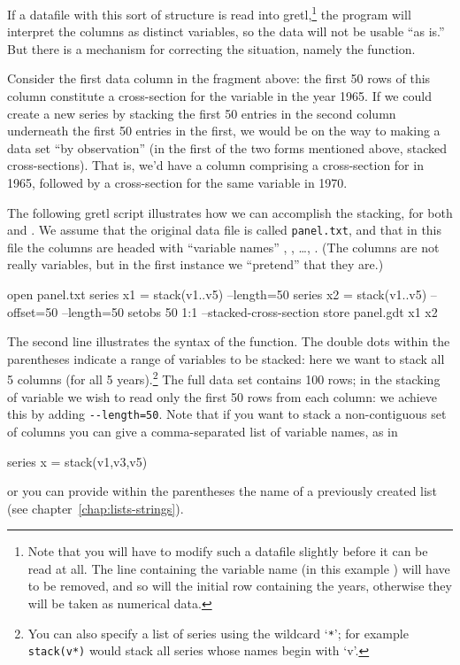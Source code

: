 If a datafile with this sort of structure is read into
gretl,\footnote{Note that you will have to modify such a
  datafile slightly before it can be read at all.  The line containing
  the variable name (in this example ) will have to be
  removed, and so will the initial row containing the years,
  otherwise they will be taken as numerical data.}  the program
will interpret the columns as distinct variables, so the data will not
be usable ``as is.''  But there is a mechanism for correcting the
situation, namely the  function.

Consider the first data column in the fragment above: the first 50 rows
of this column constitute a cross-section for the variable 
in the year 1965.  If we could create a new series by stacking the
first 50 entries in the second column underneath the first 50 entries
in the first, we would be on the way to making a data set ``by
observation'' (in the first of the two forms mentioned above, stacked
cross-sections).  That is, we'd have a column comprising a
cross-section for  in 1965, followed by a cross-section for
the same variable in 1970.

The following gretl script illustrates how we can accomplish the
stacking, for both  and .  We assume
that the original data file is called \texttt{panel.txt}, and that in
this file the columns are headed with ``variable names'' ,
, \dots, .  (The columns are not really
variables, but in the first instance we ``pretend'' that they are.)

\begin{code}
open panel.txt
series x1 = stack(v1..v5) --length=50
series x2 = stack(v1..v5) --offset=50 --length=50
setobs 50 1:1 --stacked-cross-section
store panel.gdt x1 x2
\end{code}

The second line illustrates the syntax of the  function.
The double dots within the parentheses indicate a range of variables
to be stacked: here we want to stack all 5 columns (for all 5
years).\footnote{You can also specify a list of series using
  the wildcard `\texttt{*}'; for example \texttt{stack(v*)} would
  stack all series whose names begin with `v'.} 
The full data set contains 100 rows; in the stacking of variable
 we wish to read only the first 50 rows from each column:
we achieve this by adding \verb+--length=50+.  Note that if you want
to stack a non-contiguous set of columns you can give a
comma-separated list of variable names, as in
%
\begin{code}
series x = stack(v1,v3,v5)
\end{code}
%
or you can provide within the parentheses the name of a previously
created list (see chapter~\ref{chap:lists-strings}).

